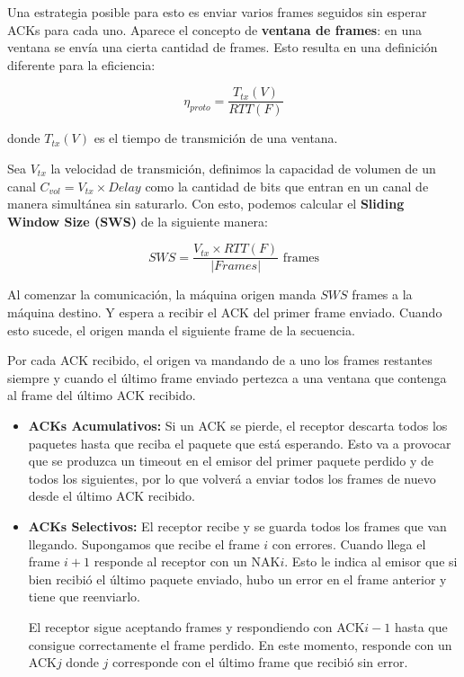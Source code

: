 Una estrategia posible para esto es enviar varios frames seguidos sin esperar ACKs para cada uno.
Aparece el concepto de \textbf{ventana de frames}: en una ventana se envía una cierta cantidad de frames. Esto resulta en una definición diferente para la eficiencia:

\[\eta_{proto} = \frac{T_{tx}(V)}{RTT(F)}\]

donde \(T_{tx}(V)\) es el tiempo de transmición de una ventana.

Sea \(V_{tx}\) la velocidad de transmición, definimos la capacidad de volumen de un canal \(C_{vol} = V_{tx}\times Delay\) como la cantidad de bits que entran en un canal de manera simultánea sin saturarlo. Con esto, podemos calcular el \textbf{Sliding Window Size (SWS)} de la siguiente manera:

\[SWS = \frac{V_{tx}\times RTT(F)}{|Frames|} \text{ frames}\]

Al comenzar la comunicación, la máquina origen manda \(SWS\) frames a la máquina destino. Y espera a recibir el ACK del primer frame enviado. Cuando esto sucede, el origen manda el siguiente frame de la secuencia.

Por cada ACK recibido, el origen va mandando de a uno los frames restantes siempre y cuando el último frame enviado pertezca a una ventana que contenga al frame del último ACK recibido.

\begin{itemize}
  \item \textbf{ACKs Acumulativos:} Si un ACK se pierde, el receptor descarta todos los paquetes hasta que reciba el paquete que está esperando. Esto va a provocar que se produzca un timeout en el emisor del primer paquete perdido y de todos los siguientes, por lo que volverá a enviar todos los frames de nuevo desde el último ACK recibido.
  \item \textbf{ACKs Selectivos:} El receptor recibe y se guarda todos los frames que van llegando. Supongamos que recibe el frame \(i\) con errores. Cuando llega el frame \(i + 1\) responde al receptor con un NAK\(i\). Esto le indica al emisor que si bien recibió el último paquete enviado, hubo un error en el frame anterior y tiene que reenviarlo.
  
  El receptor sigue aceptando frames y respondiendo con ACK\(i-1\) hasta que consigue correctamente el frame perdido. En este momento, responde con un ACK\(j\) donde \(j\) corresponde con el último frame que recibió sin error.
\end{itemize}


